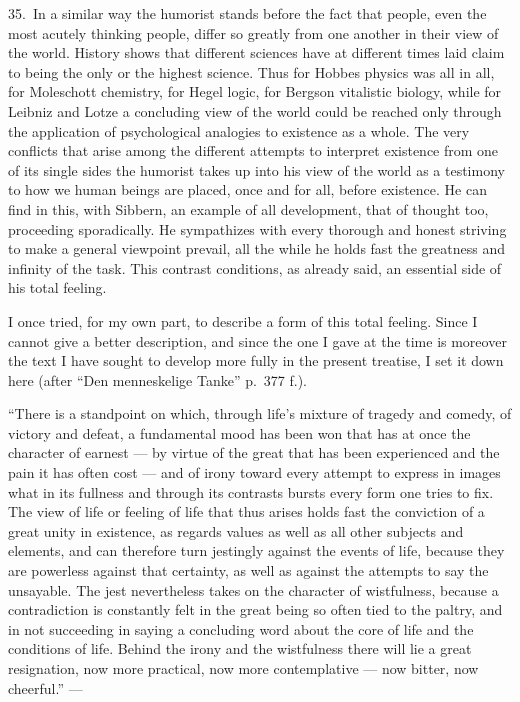 \documentclass[12pt]{book}
\newcommand{\opage}[1]{\marginnote{\footnotesize\textit{[#1]}}}
\begin{document}
35.~In a similar way the humorist stands before the fact that people, even the most
acutely thinking people, differ so greatly from one another in their view of the world.
History shows that different sciences have at different times laid claim to being the only
or the highest science. Thus for Hobbes physics was all in all, for Moleschott chemistry,
for Hegel logic, for Bergson vitalistic biology, while for Leibniz and Lotze a concluding
view of the world could be reached only through the application of psychological analogies
to existence as a whole. The very conflicts that arise among the different attempts to
interpret existence from one of its single sides the humorist takes up into his view of the
world as a testimony to how we human beings are placed, once and for all, before existence.
He can find in this, with Sibbern, an example of all development, that of thought too,
proceeding sporadically. He sympathizes with every thorough and honest striving to make a
general viewpoint prevail, all the while he holds fast the greatness and infinity of the
task. This contrast conditions, as already said, an essential side of his total feeling.

I once tried, for my own part, to describe \opage{122}a form of this total feeling. Since I
cannot give a better description, and since the one I gave at the time is moreover the text
I have sought to develop more fully in the present treatise, I set it down here (after
``Den menneskelige Tanke'' p.~377 f.).

``There is a standpoint on which, through life's mixture of tragedy and comedy, of victory
and defeat, a fundamental mood has been won that has at once the character of earnest ---
by virtue of the great that has been experienced and the pain it has often cost --- and of
irony toward every attempt to express in images what in its fullness and through its
contrasts bursts every form one tries to fix. The view of life or feeling of life that thus
arises holds fast the conviction of a great unity in existence, as regards values as well as
all other subjects and elements, and can therefore turn jestingly against the events of
life, because they are powerless against that certainty, as well as against the attempts
to say the unsayable. The jest nevertheless takes on the character of wistfulness, because
a contradiction is constantly felt in the great being so often tied to the paltry, and in
not succeeding in saying a concluding word about the core of life and the conditions of
life. Behind the irony and the wistfulness there will lie a great resignation, now more
practical, now more contemplative --- now bitter, now cheerful.'' ---
\end{document}
